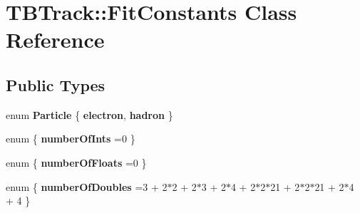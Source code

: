 \section{T\-B\-Track\-:\-:Fit\-Constants Class Reference}
\label{classTBTrack_1_1FitConstants}
\subsection*{Public Types}
\begin{DoxyCompactItemize}
\item 
enum {\bfseries Particle} \{ {\bfseries electron}, 
{\bfseries hadron}
 \}
\item 
enum \{ {\bfseries number\-Of\-Ints} =0
 \}
\item 
enum \{ {\bfseries number\-Of\-Floats} =0
 \}
\item 
enum \{ {\bfseries number\-Of\-Doubles} =3 + 2$\ast$2 + 2$\ast$3 + 2$\ast$4 + 2$\ast$2$\ast$21 + 2$\ast$2$\ast$21 + 2$\ast$4 + 4
 \}
\end{DoxyCompactItemize}
